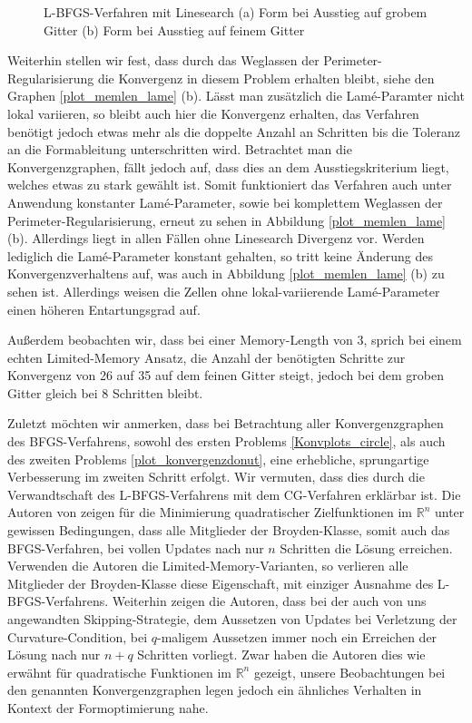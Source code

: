 \begin{figure}
\begin{subfigure}{0.5\textwidth}
	\caption{}	
	\end{subfigure}
\caption{L-BFGS-Verfahren mit Linesearch (a) Form bei Ausstieg auf grobem Gitter (b) Form bei Ausstieg auf feinem Gitter}
\label{brokendonut_bfgs_linesearch}
\end{figure}


Weiterhin stellen wir fest, dass durch das Weglassen der Perimeter-Regularisierung die Konvergenz in diesem Problem erhalten bleibt, siehe den Graphen \ref{plot_memlen_lame} (b). Lässt man zusätzlich die Lamé-Paramter nicht lokal variieren, so bleibt auch hier die Konvergenz erhalten, das Verfahren benötigt jedoch etwas mehr als die doppelte Anzahl an Schritten bis die Toleranz an die Formableitung unterschritten wird. Betrachtet man die Konvergenzgraphen, fällt jedoch auf, dass dies an dem Ausstiegskriterium liegt, welches etwas zu stark gewählt ist. Somit funktioniert das Verfahren auch unter Anwendung konstanter Lamé-Parameter, sowie bei komplettem Weglassen der Perimeter-Regularisierung, erneut zu sehen in Abbildung \ref{plot_memlen_lame} (b). Allerdings liegt in allen Fällen ohne Linesearch Divergenz vor. Werden lediglich die Lamé-Parameter konstant gehalten, so tritt keine Änderung des Konvergenzverhaltens auf, was auch in Abbildung \ref{plot_memlen_lame} (b) zu sehen ist. Allerdings weisen die Zellen ohne lokal-variierende Lamé-Parameter einen höheren Entartungsgrad auf.

Außerdem beobachten wir, dass bei einer Memory-Length von 3, sprich bei einem echten Limited-Memory Ansatz, die Anzahl der benötigten Schritte zur Konvergenz von 26 auf 35 auf dem feinen Gitter steigt, jedoch bei dem groben Gitter gleich bei 8 Schritten bleibt. 

Zuletzt möchten wir anmerken, dass bei Betrachtung aller Konvergenzgraphen des BFGS-Verfahrens, sowohl des ersten Problems \ref{Konvplots_circle}, als auch des zweiten Problems \ref{plot_konvergenzdonut}, eine erhebliche, sprungartige Verbesserung im zweiten Schritt erfolgt. Wir vermuten, dass dies durch die Verwandtschaft des L-BFGS-Verfahrens mit dem CG-Verfahren erklärbar ist. Die Autoren von \cite{bfgsjumpconv} zeigen für die Minimierung quadratischer Zielfunktionen im $\mathbb{R}^n$ unter gewissen Bedingungen, dass alle Mitglieder der Broyden-Klasse, somit auch das BFGS-Verfahren, bei vollen Updates nach nur $n$ Schritten die Lösung erreichen. Verwenden die Autoren die Limited-Memory-Varianten, so verlieren alle Mitglieder der Broyden-Klasse diese Eigenschaft, mit einziger Ausnahme des L-BFGS-Verfahrens. Weiterhin zeigen die Autoren, dass bei der auch von uns angewandten Skipping-Strategie, dem Aussetzen von Updates bei Verletzung der Curvature-Condition, bei $q$-maligem Aussetzen immer noch ein Erreichen der Lösung nach nur $n+q$ Schritten vorliegt. Zwar haben die Autoren dies wie erwähnt für quadratische Funktionen im $\mathbb{R}^n$ gezeigt, unsere Beobachtungen bei den genannten Konvergenzgraphen legen jedoch ein ähnliches Verhalten in Kontext der Formoptimierung nahe. 

